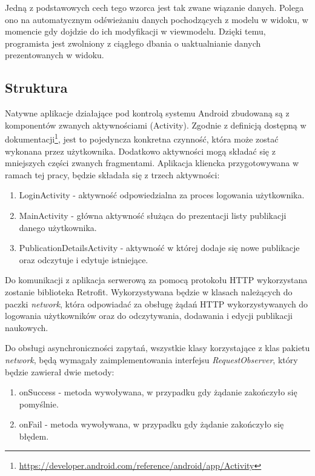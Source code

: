 \documentclass[a4paper,12pt,twoside,openany]{report}
\begin{document}
Jedną z podstawowych cech tego wzorca jest tak zwane wiązanie danych. Polega ono na automatycznym odświeżaniu danych pochodzących z modelu w widoku, w momencie gdy dojdzie do ich modyfikacji w viewmodelu. Dzięki temu, programista jest zwolniony z ciągłego dbania o uaktualnianie danych prezentowanych w widoku.

\newpage
\subsection{Struktura}
Natywne aplikacje działające pod kontrolą systemu Android zbudowaną są z komponentów zwanych aktywnościami (Activity). Zgodnie z definicją dostępną w dokumentacji\footnote{\url{https://developer.android.com/reference/android/app/Activity}}, jest to  pojedyncza konkretna czynność, która może zostać wykonana przez użytkownika. Dodatkowo aktywności mogą składać się z mniejszych części zwanych fragmentami. Aplikacja kliencka przygotowywana w ramach tej pracy, będzie składała się z trzech aktywności:
\begin{enumerate}
	\item LoginActivity - aktywność odpowiedzialna za proces logowania użytkownika.
	
	\item MainActivity - główna aktywność służąca do prezentacji listy publikacji danego użytkownika. 

	\item PublicationDetailsActivity - aktywność w której dodaje się nowe publikacje oraz odczytuje i edytuje istniejące.

\end{enumerate}

Do komunikacji z aplikacja serwerową za pomocą protokołu HTTP wykorzystana zostanie biblioteka Retrofit. Wykorzystywana będzie w klasach należących do paczki \textit{network}, która odpowiadać za obsługę żądań HTTP wykorzystywanych do logowania użytkowników oraz do odczytywania, dodawania i edycji publikacji naukowych. 

Do obsługi asynchroniczności zapytań, wszystkie klasy korzystające z klas pakietu \textit{network}, będą wymagały zaimplementowania interfejsu \textit{RequestObserver}, który będzie zawierał dwie metody:
\begin{enumerate}
	\item onSuccess - metoda wywoływana, w przypadku gdy żądanie zakończyło się pomyślnie.
	
	\item onFail - metoda wywoływana, w przypadku gdy żądanie zakończyło się błędem.
\end{enumerate}
\end{document}
